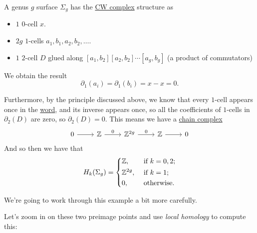 \begin{eg}
	A genus \(g\) surface \(\Sigma_g\) has the \hyperref[def:CW-Complex]{CW complex} structure as
	\begin{itemize}
		\item \(1\) \(0\)-cell \(x\).
		\item \(2g\) \(1\)-cells \(a_1, b_1, a_2, b_2, \ldots\).
		\item \(1\) \(2\)-cell \(D\) glued along \([a_1, b_2][a_2, b_2]\cdots[a_g, b_g]\) (a product of commutators)
	\end{itemize}
	We obtain the result
	\[
		\partial_1(a_i) = \partial_1(b_i) = x - x = 0.
	\]

	Furthermore, by the principle discussed above, we know that every \(1\)-cell appears once in the \hyperref[def:word]{word}, and its inverse appears once,
	so all the coefficients of \(1\)-cells in \(\partial_2(D)\) are zero, so \(\partial_2(D) = 0\). This means we have a \hyperref[def:cellular-chain-complex]{chain complex}
	\[
		\begin{tikzcd}
			0 & {\mathbb{Z}} & {\mathbb{Z}^{2g}} & {\mathbb{Z}} & 0
			\arrow[from=1-1, to=1-2]
			\arrow["0", from=1-2, to=1-3]
			\arrow["0", from=1-3, to=1-4]
			\arrow[from=1-4, to=1-5]
		\end{tikzcd}
	\]
	And so then we have that
	\[
		H_k(\Sigma _{g} ) = \begin{dcases}
			\mathbb{\MakeUppercase{z}} ,      & \text{ if } k = 0, 2 ; \\
			\mathbb{\MakeUppercase{z}} ^{2g}, & \text{ if } k = 1;     \\
			0,                                & \text{ otherwise}.
		\end{dcases}
	\]
\end{eg}

\begin{eg}
	We're going to work through this example a bit more carefully.
	\begin{figure}[H]
		\centering
		\label{fig:eg:more-careful-torus-cellular}
	\end{figure}
	Let's zoom in on these two preimage points and use \emph{local homology} to compute this:
	\begin{center}
	\end{center}
\end{eg}